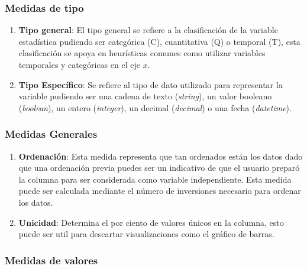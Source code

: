 \documentclass[a4paper,10pt,twocolumn]{article}
\begin{document}
	\subsubsection*{Medidas de tipo}
		\begin{enumerate}
			\item \textbf{Tipo general}: El tipo general se refiere a la clasificaci\'on de la variable estad\'istica
			pudiendo ser categ\'orica (C), cuantitativa (Q) o temporal (T), esta clasificaci\'on se apoya en
			heur\'isticas comunes como utilizar variables temporales y categ\'oricas en el eje $x$.
			\item \textbf{Tipo Espec\'ifico}: Se refiere al tipo de dato utilizado para representar la variable pudiendo
			ser una cadena de texto (\textit{string}), un valor booleano (\textit{boolean}), un entero (\textit{integer}), 
			un decimal (\textit{decimal}) o una fecha (\textit{datetime}).
		\end{enumerate}
	
	\subsubsection*{Medidas Generales}
		\begin{enumerate}
			\item \textbf{Ordenaci\'on}: Esta medida representa que tan ordenados est\'an los datos dado que una ordenaci\'on previa
			puedes ser un indicativo de que el usuario prepar\'o la columna para ser considerada como variable independiente. Esta
			medida puede ser calculada mediante el n\'umero de inversiones necesario para ordenar los datos.
			\item \textbf{Unicidad}: Determina el por ciento de valores \'unicos en la columna, esto puede ser util para descartar visualizaciones
			como el gr\'afico de barras.
		\end{enumerate}
	
	\subsubsection*{Medidas de valores}
\end{document}
